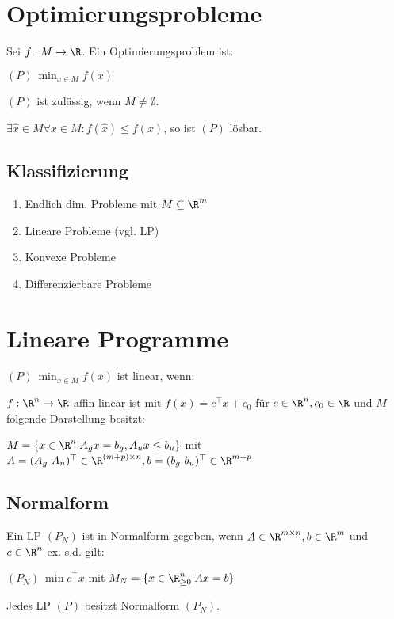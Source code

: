 \section*{Optimierungsprobleme}

Sei \(f: M \to \R\). Ein Optimierungsproblem ist:

\((P) \ \min_{x \in M} f(x)\)

\((P)\) ist zulässig, wenn \(M \neq \emptyset\).

\(\exists \hat x \in M \forall x \in M : f(\hat x) \leq f(x)\), so ist \((P)\) lösbar.

\subsection*{Klassifizierung}

\begin{enumerate}[label=(\alph*)]
	\item Endlich dim. Probleme mit \(M \subseteq \R^m\)
	\item Lineare Probleme (vgl. LP)
	\item Konvexe Probleme
	\item Differenzierbare Probleme
\end{enumerate}

\section*{Lineare Programme}

\((P) \ \min_{x \in M} f(x)\) ist linear, wenn:

\(f: \R^n \to \R\) affin linear ist mit \(f(x)=c^\top x + c_0\) für \(c \in \R^n, c_0 \in \R\) und \(M\) folgende Darstellung besitzt:

\(M = \{ x \in \R^n | A_g x = b_g, A_u x \leq b_u \}\) mit \\ \(A = (A_g \ A_n)^\top \in \R^{(m+p) \times n}, b = (b_g \ b_u)^\top \in \R^{m+p}\)

\subsection*{Normalform}

Ein LP \((P_N)\) ist in Normalform gegeben, wenn \(A \in \R^{m \times n}, b \in \R^m\) und \(c \in \R^n\) ex. s.d. gilt:

\((P_N) \ \min c^\top x\) mit \(M_N = \{ x \in \R_{\geq 0}^n | Ax=b \}\)

\spacing

Jedes LP \((P)\) besitzt Normalform \((P_N)\).

